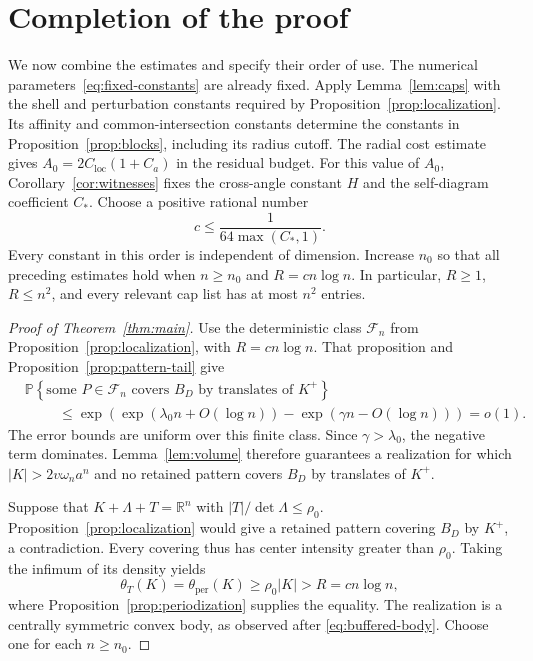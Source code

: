 \section{Completion of the proof}\label{sec:assembly}

We now combine the estimates and specify their order of use. The numerical
parameters~\eqref{eq:fixed-constants} are already fixed. Apply
Lemma~\ref{lem:caps} with the shell and perturbation constants required by
Proposition~\ref{prop:localization}. Its affinity and common-intersection
constants determine the constants in Proposition~\ref{prop:blocks},
including its radius cutoff. The radial cost estimate gives
$A_0=2C_{\mathrm{loc}}(1+C_a)$ in the residual budget.
For this value of $A_0$, Corollary~\ref{cor:witnesses} fixes the
cross-angle constant $H$ and the self-diagram coefficient $C_*$.
Choose a positive rational number
\begin{equation}\label{eq:choose-c}
 c\le\frac1{64\max(C_*,1)}.
\end{equation}
Every constant in this order is independent of dimension. Increase $n_0$
so that all preceding estimates hold when $n\ge n_0$ and
$R=c n\log n$. In particular, $R\ge1$, $R\le n^2$, and every relevant cap
list has at most $n^2$ entries.

\begin{proof}[Proof of Theorem~\ref{thm:main}]
Use the deterministic class $\mathcal F_n$ from
Proposition~\ref{prop:localization}, with $R=c n\log n$. That proposition
and Proposition~\ref{prop:pattern-tail} give
\begin{align*}
 &\mathbb P\left\{\text{some }P\in\mathcal F_n
             \text{ covers }B_D\text{ by translates of }K^+\right\}\\
 &\hspace{1cm}\le
 \exp\left(\exp(\lambda_0 n+O(\log n))
                -\exp(\gamma n-O(\log n))\right)=o(1).
\end{align*}
The error bounds are uniform over this finite class. Since
$\gamma>\lambda_0$, the negative term dominates. Lemma~\ref{lem:volume}
therefore guarantees a realization for which $|K|>2v\omega_n a^n$ and
no retained pattern covers $B_D$ by translates of $K^+$.

Suppose that $K+\Lambda+T=\mathbb R^n$ with
$|T|/\det\Lambda\le\rho_0$. Proposition~\ref{prop:localization} would give
a retained pattern covering $B_D$ by $K^+$, a contradiction. Every covering
thus has center intensity greater than $\rho_0$. Taking the infimum of
its density yields
\[
 \theta_T(K)=\theta_{\mathrm{per}}(K)\ge\rho_0|K|>R=c n\log n,
\]
where Proposition~\ref{prop:periodization} supplies the equality.
The realization is a centrally symmetric convex body, as observed after
\eqref{eq:buffered-body}. Choose one for each $n\ge n_0$.
\end{proof}


